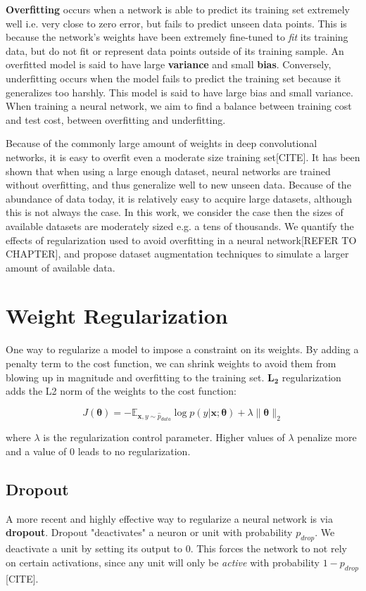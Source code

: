 \textbf{Overfitting} occurs when a network is able to predict its training set extremely well i.e. very close to zero error, but fails to predict
unseen data points. This is because the network's weights have been extremely fine-tuned to \textit{fit} its training data, but do not fit or represent
data points outside of its training sample.
An overfitted model is said to have large \textbf{variance} and small \textbf{bias}. Conversely, underfitting occurs when the model fails to predict
the training set because it generalizes too harshly. This model is said to have large bias and small variance. When training a neural network,
we aim to find a balance between training cost and test cost, between overfitting and underfitting.

Because of the commonly large amount of weights in deep convolutional networks, it is easy to overfit even a moderate size training set[CITE].
It has been shown that when using a large enough dataset, neural networks are trained without overfitting, and thus generalize well
to new unseen data. Because of the abundance of data today, it is relatively easy to acquire large datasets, although this is not always the case.
In this work, we consider the case then the sizes of available datasets are moderately sized e.g. a tens of thousands.
We quantify the effects of regularization used to avoid overfitting in a neural network[REFER TO CHAPTER], and propose dataset augmentation techniques to
simulate a larger amount of available data.

\section{Weight Regularization}
One way to regularize a model to impose a constraint on its weights. By adding a penalty term to the cost function, we can shrink weights to avoid
them from blowing up in magnitude and overfitting to the training set. $\bm{L_2}$ regularization
adds the L2 norm of the weights to the cost function:

\[J(\bm{\theta}) = -\mathbb{E}_{\bm{x},y \sim \hat p_{data}} \log \textit{p}(y|\bm{x};\bm{\theta}) + \lambda \lVert \bm{\theta} \rVert_{2}\]

where $\lambda$ is the regularization control parameter. Higher values of $\lambda$ penalize more and a value of 0 leads to no regularization.

\subsection{Dropout}
A more recent and highly effective way to regularize a neural network is via \textbf{dropout}.
Dropout "deactivates" a neuron or unit with probability $p_{drop}$. We deactivate a unit
by setting its output to 0. This forces the network to not rely on certain
activations, since any unit will only be \textit{active} with probability $1-p_{drop}$[CITE].
